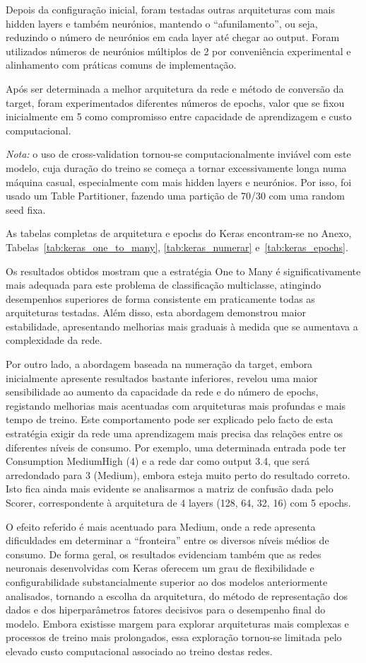 \documentclass[11pt,a4paper]{article}
\begin{document}
Depois da configuração inicial, foram testadas outras arquiteturas com mais hidden layers e também neurónios, mantendo o ``afunilamento'', ou seja, reduzindo o número de neurónios em cada layer até chegar ao output. Foram utilizados números de neurónios múltiplos de 2 por conveniência experimental e alinhamento com práticas comuns de implementação.

Após ser determinada a melhor arquitetura da rede e método de conversão da target, foram experimentados diferentes números de epochs, valor que se fixou inicialmente em 5 como compromisso entre capacidade de aprendizagem e custo computacional.

\textit{Nota:} o uso de cross-validation tornou-se computacionalmente inviável com este modelo, cuja duração do treino se começa a tornar excessivamente longa numa máquina casual, especialmente com mais hidden layers e neurónios. Por isso, foi usado um Table Partitioner, fazendo uma partição de 70/30 com uma random seed fixa.

As tabelas completas de arquitetura e epochs do Keras encontram-se no Anexo, Tabelas~\ref{tab:keras_one_to_many}, \ref{tab:keras_numerar} e~\ref{tab:keras_epochs}.

Os resultados obtidos mostram que a estratégia One to Many é significativamente mais adequada para este problema de classificação multiclasse, atingindo desempenhos superiores de forma consistente em praticamente todas as arquiteturas testadas. Além disso, esta abordagem demonstrou maior estabilidade, apresentando melhorias mais graduais à medida que se aumentava a complexidade da rede.

Por outro lado, a abordagem baseada na numeração da target, embora inicialmente apresente resultados bastante inferiores, revelou uma maior sensibilidade ao aumento da capacidade da rede e do número de epochs, registando melhorias mais acentuadas com arquiteturas mais profundas e mais tempo de treino. Este comportamento pode ser explicado pelo facto de esta estratégia exigir da rede uma aprendizagem mais precisa das relações entre os diferentes níveis de consumo. Por exemplo, uma determinada entrada pode ter Consumption MediumHigh (4) e a rede dar como output 3.4, que será arredondado para 3 (Medium), embora esteja muito perto do resultado correto. Isto fica ainda mais evidente se analisarmos a matriz de confusão dada pelo Scorer, correspondente à arquitetura de 4 layers (128, 64, 32, 16) com 5 epochs.

O efeito referido é mais acentuado para Medium, onde a rede apresenta dificuldades em determinar a ``fronteira'' entre os diversos níveis médios de consumo.
De forma geral, os resultados evidenciam também que as redes neuronais desenvolvidas com Keras oferecem um grau de flexibilidade e configurabilidade substancialmente superior ao dos modelos anteriormente analisados, tornando a escolha da arquitetura, do método de representação dos dados e dos hiperparâmetros fatores decisivos para o desempenho final do modelo. Embora existisse margem para explorar arquiteturas mais complexas e processos de treino mais prolongados, essa exploração tornou-se limitada pelo elevado custo computacional associado ao treino destas redes.
\end{document}
